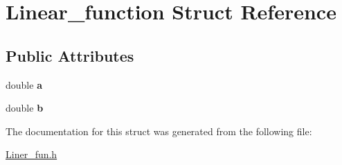 \hypertarget{struct_linear__function}{}\section{Linear\+\_\+function Struct Reference}
\label{struct_linear__function}
\subsection*{Public Attributes}
\begin{DoxyCompactItemize}
\item 
\mbox{\label{struct_linear__function_a1137f744bb2f9aaa54dd31d6897f4a57}} 
double {\bfseries a}
\item 
\mbox{\label{struct_linear__function_acf6fb548df4b45f423d5c6bf1d876e5b}} 
double {\bfseries b}
\end{DoxyCompactItemize}


The documentation for this struct was generated from the following file\+:\begin{DoxyCompactItemize}
\item 
\hyperlink{_liner__fun_8h}{Liner\+\_\+fun.\+h}\end{DoxyCompactItemize}
